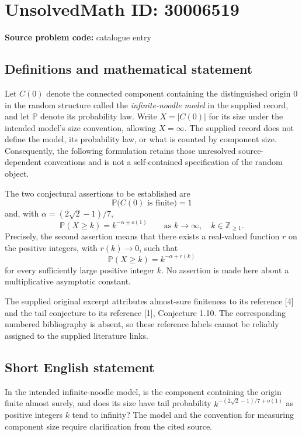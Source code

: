 \documentclass[11pt]{article}
\newcommand{\Z}{\mathbb{Z}}
\begin{document}
\section*{UnsolvedMath ID: 30006519}
\textbf{Source problem code:} catalogue entry
\subsection{Definitions and mathematical statement}
Let \(C(0)\) denote the connected component containing the distinguished origin \(0\) in the random structure called the \emph{infinite-noodle model} in the supplied record, and let \(\mathbb P\) denote its probability law. Write \(X=|C(0)|\) for its size under the intended model's size convention, allowing \(X=\infty\). The supplied record does not define the model, its probability law, or what is counted by component size. Consequently, the following formulation retains those unresolved source-dependent conventions and is not a self-contained specification of the random object.

The two conjectural assertions to be established are
\[
\mathbb P\bigl(C(0)\text{ is finite}\bigr)=1
\]
and, with \(\alpha=(2\sqrt{2}-1)/7\),
\[
\mathbb P(X\geq k)=k^{-\alpha+o(1)}
\qquad\text{as }k\to\infty,\quad k\in\Z_{\geq1}.
\]
Precisely, the second assertion means that there exists a real-valued function \(r\) on the positive integers, with \(r(k)\to0\), such that
\[
\mathbb P(X\geq k)=k^{-\alpha+r(k)}
\]
for every sufficiently large positive integer \(k\). No assertion is made here about a multiplicative asymptotic constant.

The supplied original excerpt attributes almost-sure finiteness to its reference [4] and the tail conjecture to its reference [1], Conjecture 1.10. The corresponding numbered bibliography is absent, so these reference labels cannot be reliably assigned to the supplied literature links.
\subsection{Short English statement}
In the intended infinite-noodle model, is the component containing the origin finite almost surely, and does its size have tail probability \(k^{-(2\sqrt{2}-1)/7+o(1)}\) as positive integers \(k\) tend to infinity? The model and the convention for measuring component size require clarification from the cited source.
\end{document}

